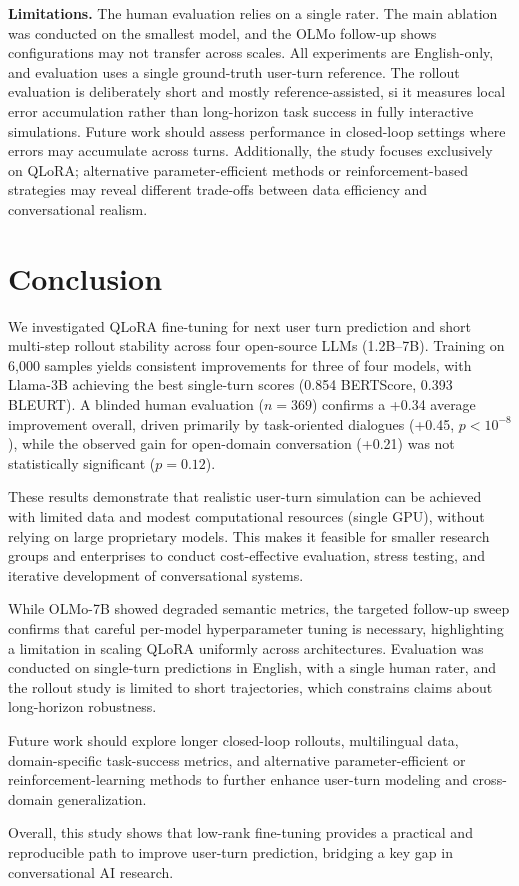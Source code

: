 \documentclass[conference]{IEEEtran}
\begin{document}
\textbf{Limitations.} The human evaluation relies on a single rater. The main ablation was conducted on the smallest model, and the OLMo follow-up shows configurations may not transfer across scales. All experiments are English-only, and evaluation uses a single ground-truth user-turn reference. The rollout evaluation is deliberately short and mostly reference-assisted, si it measures local error accumulation rather than long-horizon task success in fully interactive simulations.
Future work should assess performance in closed-loop settings where errors may accumulate across turns. 
Additionally, the study focuses exclusively on QLoRA; alternative parameter-efficient methods or reinforcement-based strategies may reveal different trade-offs between data efficiency and conversational realism.

\section{Conclusion}

We investigated QLoRA fine-tuning for next user turn prediction and short multi-step rollout stability across four open-source LLMs (1.2B--7B). Training on 6{,}000 samples yields consistent improvements for three of four models, with Llama-3B achieving the best single-turn scores (0.854 BERTScore, 0.393 BLEURT). A blinded human evaluation ($n{=}369$) confirms a +0.34 average improvement overall, driven primarily by task-oriented dialogues (+0.45, $p < 10^{-8}$), while the observed gain for open-domain conversation (+0.21) was not statistically significant ($p = 0.12$).

These results demonstrate that realistic user-turn simulation can be achieved with limited data and modest computational resources (single GPU), without relying on large proprietary models. This makes it feasible for smaller research groups and enterprises to conduct cost-effective evaluation, stress testing, and iterative development of conversational systems. 

While OLMo-7B showed degraded semantic metrics, the targeted follow-up sweep confirms that careful per-model hyperparameter tuning is necessary, highlighting a limitation in scaling QLoRA uniformly across architectures. Evaluation was conducted on single-turn predictions in English, with a single human rater, and the rollout study is limited to short trajectories, which constrains claims about long-horizon robustness.

Future work should explore longer closed-loop rollouts, multilingual data, domain-specific task-success metrics, and alternative parameter-efficient or reinforcement-learning methods to further enhance user-turn modeling and cross-domain generalization.

Overall, this study shows that low-rank fine-tuning provides a practical and reproducible path to improve user-turn prediction, bridging a key gap in conversational AI research.


\end{document}
